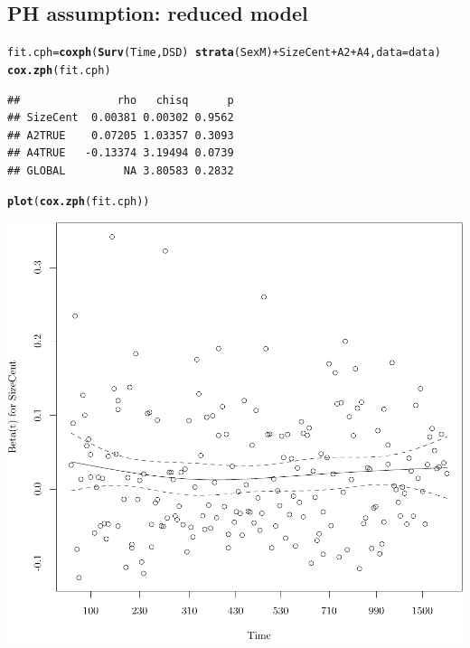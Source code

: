 \documentclass{article}\usepackage[]{graphicx}\usepackage[]{color}
\makeatletter
\def\maxwidth{ %
  \ifdim\Gin@nat@width>\linewidth
    \linewidth
  \else
    \Gin@nat@width
  \fi
}
\newcommand{\hlopt}[1]{\textcolor[rgb]{0,0,0}{#1}}%
\newcommand{\hlstd}[1]{\textcolor[rgb]{0.345,0.345,0.345}{#1}}%
\newcommand{\hlkwb}[1]{\textcolor[rgb]{0.69,0.353,0.396}{#1}}%
\newcommand{\hlkwc}[1]{\textcolor[rgb]{0.333,0.667,0.333}{#1}}%
\newcommand{\hlkwd}[1]{\textcolor[rgb]{0.737,0.353,0.396}{\textbf{#1}}}%
\newenvironment{kframe}{%
 \def\at@end@of@kframe{}%
 \ifinner\ifhmode%
  \def\at@end@of@kframe{\end{minipage}}%
  \begin{minipage}{\columnwidth}%
 \fi\fi%
 \def\FrameCommand##1{\hskip\@totalleftmargin \hskip-\fboxsep
 \colorbox{shadecolor}{##1}\hskip-\fboxsep
     \hskip-\linewidth \hskip-\@totalleftmargin \hskip\columnwidth}%
 \MakeFramed {\advance\hsize-\width
   \@totalleftmargin\z@ \linewidth\hsize
   \@setminipage}}%
 {\par\unskip\endMakeFramed%
 \at@end@of@kframe}
\newenvironment{knitrout}{}{} %
\makeatother
\begin{document}
\subsection{PH assumption: reduced model}
\begin{knitrout}
\color{fgcolor}\begin{kframe}
\begin{alltt}
\hlstd{fit.cph} \hlkwb{=} \hlkwd{coxph}\hlstd{(}\hlkwd{Surv}\hlstd{(Time, DSD)} \hlopt{~} \hlkwd{strata}\hlstd{(SexM)} \hlopt{+} \hlstd{SizeCent} \hlopt{+} \hlstd{A2} \hlopt{+} \hlstd{A4,} \hlkwc{data} \hlstd{= data)}
\hlkwd{cox.zph}\hlstd{(fit.cph)}
\end{alltt}
\begin{verbatim}
##               rho   chisq      p
## SizeCent  0.00381 0.00302 0.9562
## A2TRUE    0.07205 1.03357 0.3093
## A4TRUE   -0.13374 3.19494 0.0739
## GLOBAL         NA 3.80583 0.2832
\end{verbatim}
\begin{alltt}
\hlkwd{plot}\hlstd{(}\hlkwd{cox.zph}\hlstd{(fit.cph))}
\end{alltt}
\end{kframe}

{\centering \includegraphics[width=\maxwidth]{figure/05-eda-ph-check-reduced-2-1} 

}





\end{knitrout}
\end{document}
